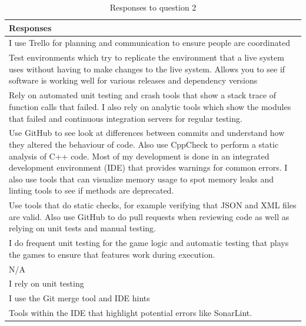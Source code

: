 \documentclass[../main.tex]{subfiles}
\begin{document}
\begin{table}[H]
\centering
    \begin{tabular}{|p{15cm}|}
        \hline
        \textbf{Responses}\\ 
        \hline\hline
        I use Trello for planning and communication to ensure people are coordinated\\
        \hline
        Test environments which try to replicate the environment that a live system uses without having to make changes to the live system. Allows you to see if software is working well for various releases and dependency versions\\
        \hline
        Rely on automated unit testing and crash tools that show a stack trace of function calls that failed. I also rely on analytic tools which show the modules that failed and continuous integration servers for regular testing.\\
        \hline
        Use GitHub to see look at differences between commits and understand how they altered the behaviour of code. Also use CppCheck to perform a static analysis of C++ code. Most of my development is done in an integrated development environment (IDE) that provides warnings for common errors. I also use tools that can visualize memory usage to spot memory leaks and linting tools to see if methods are deprecated.\\
        \hline
        Use tools that do static checks, for example verifying that JSON and XML files are valid. Also use GitHub to do pull requests when reviewing code as well as relying on unit tests and manual testing.\\
        \hline
        I do frequent unit testing for the game logic and automatic testing that plays the games to ensure that features work during execution.\\
        \hline
        N/A\\
        \hline
        I rely on unit testing\\
        \hline
        I use the Git merge tool and IDE hints\\
        \hline
        Tools within the IDE that highlight potential errors like SonarLint.\\
        \hline
    \end{tabular}
\caption{Responses to question 2}
\label{table:rq2Table2}
\end{table}
\end{document}
